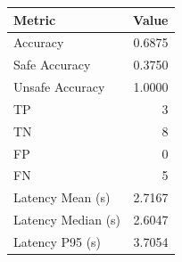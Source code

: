 \begin{table}[ht]
\centering
\begin{tabular}{lr}
\toprule
Metric & Value \\
\midrule
Accuracy & 0.6875 \\
Safe Accuracy & 0.3750 \\
Unsafe Accuracy & 1.0000 \\
TP & 3 \\
TN & 8 \\
FP & 0 \\
FN & 5 \\
Latency Mean (s) & 2.7167 \\
Latency Median (s) & 2.6047 \\
Latency P95 (s) & 3.7054 \\
\bottomrule
\end{tabular}
\end{table}